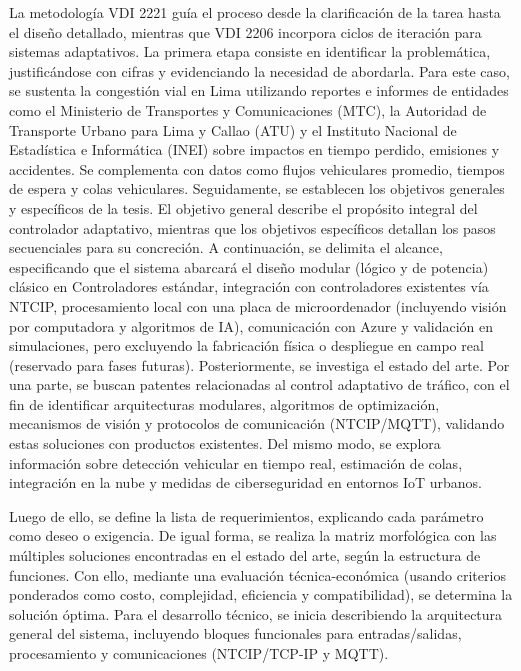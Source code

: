 \documentclass[12pt,a4paper,oneside]{report}
\begin{document}
La metodología VDI 2221 guía el proceso desde la clarificación de la tarea hasta el diseño detallado, mientras que VDI 2206 incorpora ciclos de iteración para sistemas adaptativos. La primera etapa consiste en identificar la problemática, justificándose con cifras y evidenciando la necesidad de abordarla. Para este caso, se sustenta la congestión vial en Lima utilizando reportes e informes de entidades como el Ministerio de Transportes y Comunicaciones (MTC), la Autoridad de Transporte Urbano para Lima y Callao (ATU) y el Instituto Nacional de Estadística e Informática (INEI) sobre impactos en tiempo perdido, emisiones y accidentes. Se complementa con datos como flujos vehiculares promedio, tiempos de espera y colas vehiculares. Seguidamente, se establecen los objetivos generales y específicos de la tesis. El objetivo general describe el propósito integral del controlador adaptativo, mientras que los objetivos específicos detallan los pasos secuenciales para su concreción. A continuación, se delimita el alcance, especificando que el sistema abarcará el diseño modular (lógico y de potencia) clásico en Controladores estándar, integración con controladores existentes vía NTCIP, procesamiento local con una placa de microordenador (incluyendo visión por computadora y algoritmos de IA), comunicación con Azure y validación en simulaciones, pero excluyendo la fabricación física o despliegue en campo real (reservado para fases futuras). Posteriormente, se investiga el estado del arte. Por una parte, se buscan patentes relacionadas al control adaptativo de tráfico, con el fin de identificar arquitecturas modulares, algoritmos de optimización, mecanismos de visión y protocolos de comunicación (NTCIP/MQTT), validando estas soluciones con productos existentes. Del mismo modo, se explora información sobre detección vehicular en tiempo real, estimación de colas, integración en la nube y medidas de ciberseguridad en entornos IoT urbanos.

Luego de ello, se define la lista de requerimientos, explicando cada parámetro como deseo o exigencia. De igual forma, se realiza la matriz morfológica con las múltiples soluciones encontradas en el estado del arte, según la estructura de funciones. Con ello, mediante una evaluación técnica-económica (usando criterios ponderados como costo, complejidad, eficiencia y compatibilidad), se determina la solución óptima. Para el desarrollo técnico, se inicia describiendo la arquitectura general del sistema, incluyendo bloques funcionales para entradas/salidas, procesamiento y comunicaciones (NTCIP/TCP-IP y MQTT).
\end{document}
